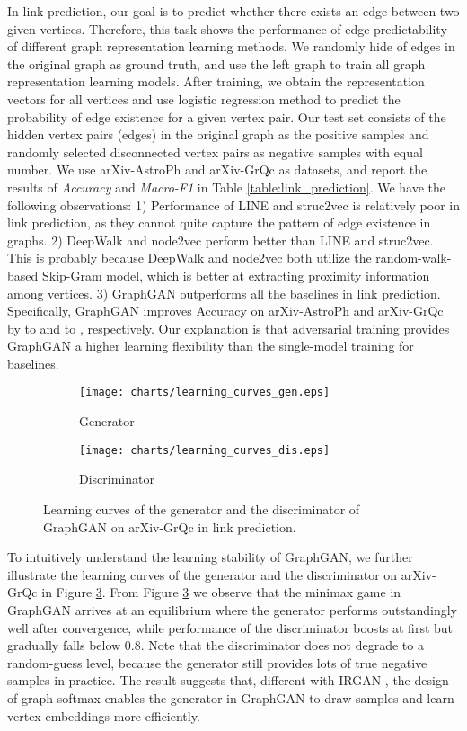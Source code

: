\documentclass[letterpaper]{article}
\begin{document}
		In link prediction, our goal is to predict whether there exists an edge between two given vertices.
		Therefore, this task shows the performance of edge predictability of different graph representation learning methods.
		We randomly hide  of edges in the original graph as ground truth, and use the left graph to train all graph representation learning models.
		After training, we obtain the representation vectors for all vertices and use logistic regression method to predict the probability of edge existence for a given vertex pair.
		Our test set consists of the hidden  vertex pairs (edges) in the original graph as the positive samples and randomly selected disconnected vertex pairs as negative samples with equal number.
		We use arXiv-AstroPh and arXiv-GrQc as datasets, and report the results of \textit{Accuracy} and \textit{Macro-F1} in Table \ref{table:link_prediction}.
		We have the following observations:
		1) Performance of LINE and struc2vec is relatively poor in link prediction, as they cannot quite capture the pattern of edge existence in graphs.
		2)  DeepWalk and node2vec perform better than LINE and struc2vec.
		This is probably because DeepWalk and node2vec both utilize the random-walk-based Skip-Gram model, which is better at extracting proximity information among vertices.
		3) GraphGAN outperforms all the baselines in link prediction.
		Specifically, GraphGAN improves Accuracy on arXiv-AstroPh and arXiv-GrQc by  to  and  to , respectively.
		Our explanation is that adversarial training provides GraphGAN a higher learning flexibility than the single-model training for baselines.
		
		\begin{figure}
			\centering
			\begin{subfigure}[b]{0.23\textwidth}
   				\texttt{[image: charts/learning\_curves\_gen.eps]}
   				\caption{Generator}
   				\label{fig:generator}
			\end{subfigure}
			\hfill
			\begin{subfigure}[b]{0.23\textwidth}
				\texttt{[image: charts/learning\_curves\_dis.eps]}
				\caption{Discriminator}
				\label{fig:discriminator}
			\end{subfigure}
			\caption{Learning curves of the generator and the discriminator of GraphGAN on arXiv-GrQc in link prediction.}			
			\label{fig:learning_curves}
		\end{figure}
		
		To intuitively understand the learning stability of GraphGAN, we further illustrate the learning curves of the generator and the discriminator on arXiv-GrQc in Figure \ref{fig:learning_curves}.
		From Figure \ref{fig:learning_curves} we observe that the minimax game in GraphGAN arrives at an equilibrium where the generator performs outstandingly well after convergence, while performance of the discriminator boosts at first but gradually falls below 0.8.
		Note that the discriminator does not degrade to a random-guess level, because the generator still provides lots of true negative samples in practice.
		The result suggests that, different with IRGAN \cite{wang2017irgan}, the design of graph softmax enables the generator in GraphGAN to draw samples and learn vertex embeddings more efficiently.
	
\end{document}
